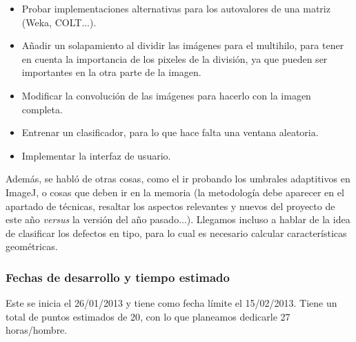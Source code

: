 \begin{itemize}
\item Probar implementaciones alternativas para los autovalores de una matriz (Weka, COLT...).
\item Añadir un solapamiento al dividir las imágenes para el multihilo, para tener en cuenta la importancia de los pixeles de la división, ya que pueden ser importantes en la otra parte de la imagen.
\item Modificar la convolución de las imágenes para hacerlo con la imagen completa.
\item Entrenar un clasificador, para lo que hace falta una ventana aleatoria.
\item Implementar la interfaz de usuario.
\end{itemize}

Además, se habló de otras cosas, como el ir probando los umbrales adaptitivos en ImageJ, o cosas que deben ir en la memoria (la metodología debe aparecer en el apartado de técnicas, resaltar los aspectos relevantes y nuevos del proyecto de este año \textit{versus} la versión del año pasado...). Llegamos incluso a hablar de la idea de clasificar los defectos en tipo, para lo cual es necesario calcular características geométricas.

\subsubsection*{Fechas de desarrollo y tiempo estimado}
Este \sprint{} se inicia el 26/01/2013 y tiene como fecha límite el 15/02/2013. Tiene un total de puntos estimados de 20, con lo que planeamos dedicarle 27 horas/hombre.


